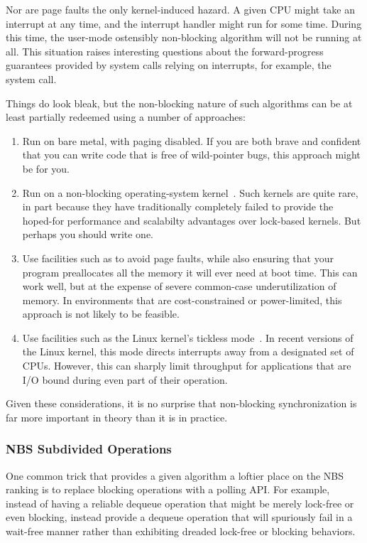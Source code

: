 Nor are page faults the only kernel-induced hazard.
A given CPU might take an interrupt at any time, and the interrupt
handler might run for some time.
During this time, the user-mode ostensibly non-blocking algorithm
will not be running at all.
This situation raises interesting questions about the forward-progress
guarantees provided by system calls relying on interrupts, for example,
the  system call.

Things do look bleak, but the non-blocking nature of such algorithms
can be at least partially redeemed using a number of approaches:

\begin{enumerate}
\item	Run on bare metal, with paging disabled.
	If you are both brave and confident that you can write code that
	is free of wild-pointer bugs, this approach might be for you.
\item	Run on a non-blocking operating-system kernel~\cite{Cheriton96a}.
	Such kernels are quite rare, in part because they have
	traditionally completely failed to provide the hoped-for
	performance and scalabilty advantages over lock-based kernels.
	But perhaps you should write one.
\item	Use facilities such as  to avoid page faults,
	while also ensuring that your program preallocates all the
	memory it will ever need at boot time.
	This can work well, but at the expense of severe common-case
	underutilization of memory.
	In environments that are cost-constrained or power-limited,
	this approach is not likely to be feasible.
\item	Use facilities such as the Linux kernel's
	 tickless mode~\cite{JonCorbet2013NO-HZ-FULL}.
	In recent versions of the Linux kernel, this mode directs
	interrupts away from a designated set of CPUs.
	However, this can sharply limit throughput for applications that
	are I/O bound during even part of their operation.
\end{enumerate}

Given these considerations, it is no surprise that non-blocking
synchronization is far more important in theory than it is in practice.

\subsubsection{NBS Subdivided Operations}
\label{sec:advsync:NBS Subdivided Operations}

One common trick that provides a given algorithm a loftier place on
the NBS ranking is to replace blocking operations with a polling API.
For example, instead of having a reliable dequeue operation that might be
merely lock-free or even blocking, instead provide a dequeue operation
that will spuriously fail in a wait-free manner rather than exhibiting
dreaded lock-free or blocking behaviors.

